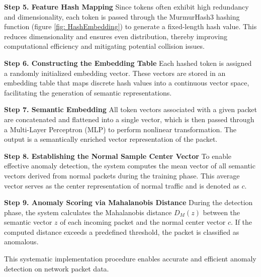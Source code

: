 \begin{ZhChapter}
    \textbf{Step 5. Feature Hash Mapping}
    Since tokens often exhibit high redundancy and dimensionality, each token is passed through the MurmurHash3 hashing function (figure \ref{fig: HashEmbedding}) to generate a fixed-length hash value. This reduces dimensionality and ensures even distribution, thereby improving computational efficiency and mitigating potential collision issues.

    \textbf{Step 6. Constructing the Embedding Table}
    Each hashed token is assigned a randomly initialized embedding vector. These vectors are stored in an embedding table that maps discrete hash values into a continuous vector space, facilitating the generation of semantic representations.

    \textbf{Step 7. Semantic Embedding}
    All token vectors associated with a given packet are concatenated and flattened into a single vector, which is then passed through a Multi-Layer Perceptron (MLP) to perform nonlinear transformation. The output is a semantically enriched vector representation of the packet.

    \textbf{Step 8. Establishing the Normal Sample Center Vector}
    To enable effective anomaly detection, the system computes the mean vector of all semantic vectors derived from normal packets during the training phase. This average vector serves as the center representation of normal traffic and is denoted as $c$.

    \textbf{Step 9. Anomaly Scoring via Mahalanobis Distance}
    During the detection phase, the system calculates the Mahalanobis distance $D_M(z)$ between the semantic vector $z$ of each incoming packet and the normal center vector $c$. If the computed distance exceeds a predefined threshold, the packet is classified as anomalous.

    This systematic implementation procedure enables accurate and efficient anomaly detection on network packet data.


\end{ZhChapter}